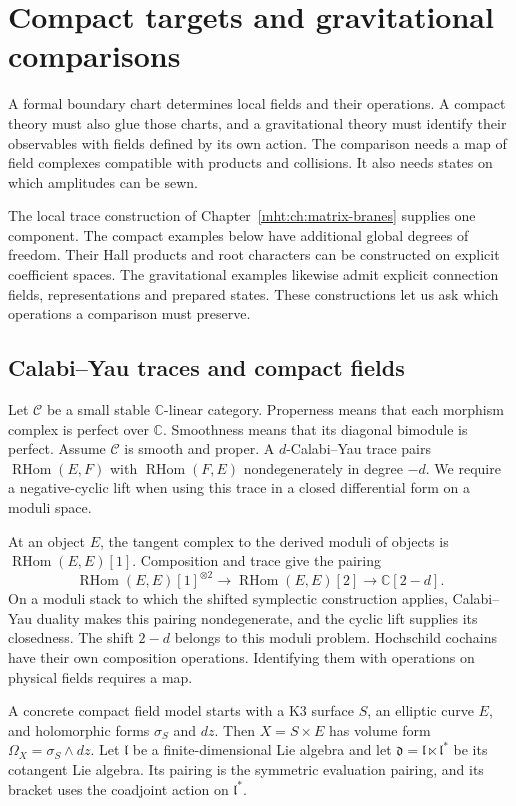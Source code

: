 \chapter{Compact targets and gravitational comparisons}
\label{mht:ch:compact-gravity}

A formal boundary chart determines local fields and their operations.
A compact theory must also glue those charts, and a gravitational
theory must identify their observables with fields defined by its own
action. The comparison needs a map of field complexes compatible
with products and collisions. It also needs states on which
amplitudes can be sewn.

The local trace construction of
Chapter~\ref{mht:ch:matrix-branes} supplies one component.
The compact examples below have additional global degrees of freedom.
Their Hall products and root characters can be constructed on explicit
coefficient spaces. The gravitational examples likewise admit explicit
connection fields, representations and prepared states. These
constructions let us ask which operations a comparison must preserve.

\section{Calabi--Yau traces and compact fields}

Let $\mathcal C$ be a small stable $\mathbb C$-linear category.
Properness means that each morphism complex is perfect over
$\mathbb C$. Smoothness means that its diagonal bimodule is perfect.
Assume $\mathcal C$ is smooth and proper. A $d$-Calabi--Yau trace pairs
$\operatorname{RHom}(E,F)$ with $\operatorname{RHom}(F,E)$
nondegenerately in degree $-d$. We require a negative-cyclic lift
when using this trace in a closed differential form on a moduli space.

At an object $E$, the tangent complex to the derived moduli of objects
is $\operatorname{RHom}(E,E)[1]$. Composition and trace give the pairing
\[
 \operatorname{RHom}(E,E)[1]^{\otimes2}
 \longrightarrow \operatorname{RHom}(E,E)[2]
 \longrightarrow \mathbb C[2-d].
\]
On a moduli stack to which the shifted symplectic construction applies,
Calabi--Yau duality makes this pairing nondegenerate, and the cyclic
lift supplies its closedness. The shift $2-d$ belongs to this moduli
problem. Hochschild cochains have their own composition operations.
Identifying them with operations on physical fields requires a map.

A concrete compact field model starts with a K3 surface $S$, an
elliptic curve $E$, and holomorphic forms $\sigma_S$ and $dz$.
Then $X=S\times E$ has volume form $\Omega_X=\sigma_S\wedge dz$.
Let $\mathfrak l$ be a finite-dimensional Lie algebra and let
$\mathfrak d=\mathfrak l\ltimes\mathfrak l^*$ be its cotangent Lie
algebra. Its pairing is the symmetric evaluation pairing, and its
bracket uses the coadjoint action on $\mathfrak l^*$.

